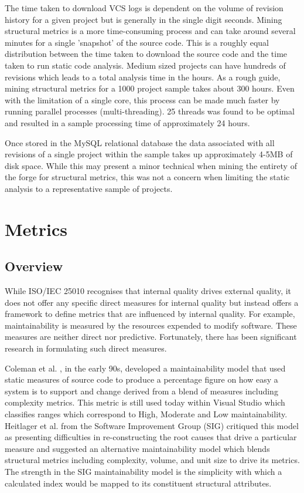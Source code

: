 The time taken to download VCS logs is dependent on the volume of revision history for a given project but is generally in the single digit seconds. Mining structural metrics is a more time-consuming process and can take around several minutes for a single 'snapshot' of the source code. This is a roughly equal distribution between the time taken to download the source code and the time taken to run static code analysis. Medium sized projects can have hundreds of revisions which leads to a total analysis time in the hours. As a rough guide, mining structural metrics for a 1000 project sample takes about 300 hours. Even with the limitation of a single core, this process can be made much faster by running parallel processes (multi-threading). 25 threads was found to be optimal and resulted in a sample processing time of approximately 24 hours.

Once stored in the MySQL relational database the data associated with all revisions of a single project within the sample takes up approximately 4-5MB of disk space. While this may present a minor technical when mining the entirety of the forge for structural metrics, this was not a concern when limiting the static analysis to a representative sample of projects.

\section{Metrics} %
\subsection{Overview}
While ISO/IEC 25010 recognises that internal quality drives external quality, it does not offer any specific direct measures for internal quality but instead offers a framework to define metrics that are influenced by internal quality. For example, maintainability is measured by the resources expended to modify software. These measures are neither direct nor predictive. Fortunately, there has been significant research in formulating such direct measures. 

Coleman et al. \citep{coleman1994using}, in the early 90s, developed a maintainability model that used static measures of source code to produce a percentage figure on how easy  a system is to support and change derived from a blend of measures including complexity metrics. This metric is still used today within Visual Studio \citep{msdn2015code} which classifies ranges which correspond to High, Moderate and Low maintainability. Heitlager et al. \citep{heitlager2007practical} from the Software Improvement Group (SIG) critiqued this model as presenting difficulties in re-constructing the root causes that drive a particular measure and suggested an alternative maintainability model which blends structural metrics including complexity, volume, and unit size to drive its metrics. The strength in the SIG maintainability model is the simplicity with which a calculated index would be mapped to its constituent structural attributes.


